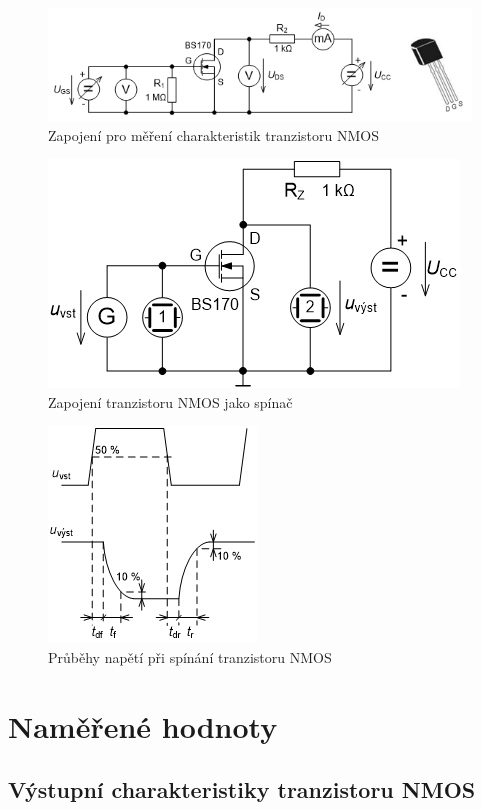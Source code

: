 \documentclass[a4paper, czech]{article}
\begin{document}
\begin{figure}[H]
    \centering
    \includegraphics{zapojeni1.png}
    \caption{Zapojení pro měření charakteristik tranzistoru NMOS}
\end{figure}

\begin{figure}[H]
    \centering
    \includegraphics{zapojeni2.png}
    \caption{Zapojení tranzistoru NMOS jako spínač}
\end{figure}

\begin{figure}[H]
    \centering
    \includegraphics{prubehy.png}
    \caption{Průběhy napětí při spínání tranzistoru NMOS}
\end{figure}

\section{Naměřené hodnoty}

\subsection{Výstupní charakteristiky tranzistoru NMOS}
\end{document}
